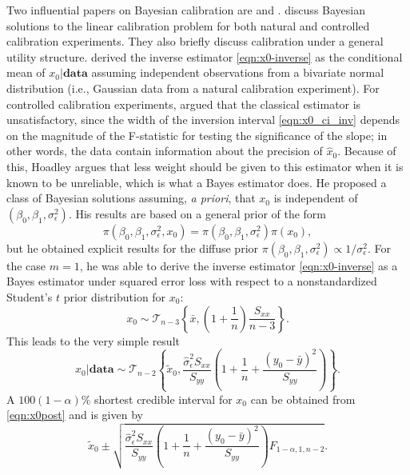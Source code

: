 \documentclass[cmfont,usenames,dvipsnames,leqno]{afit-etd}\usepackage[]{graphicx}\usepackage[]{color}
\newcommand{\wh}[1]{\ensuremath{\widehat{#1}}}
\newcommand{\wt}[1]{\ensuremath{\widetilde{#1}}}
\begin{document}
Two influential papers on Bayesian calibration are \citet{hoadley_bayesian_1970} and \citet{hunter_bayesian_1981}. \citet[chap. 10]{aitchison_statistical_1980} discuss Bayesian solutions to the linear calibration problem for both natural and controlled calibration experiments. They also briefly discuss calibration under a general utility structure. \citet{dunsmore_bayesian_1967} derived the inverse estimator \eqref{eqn:x0-inverse} as the conditional mean of $x_0|\mathbf{data}$ assuming independent observations from a bivariate normal distribution (i.e., Gaussian data from a natural calibration experiment). For controlled calibration experiments, \citet{hoadley_bayesian_1970} argued that the classical estimator is unsatisfactory, since the width of the inversion interval \eqref{eqn:x0_ci_inv} depends on the magnitude of the F-statistic for testing the significance of the slope; in other words, the data contain information about the precision of $\wh{x}_0$. Because of this, Hoadley argues that less weight should be given to this estimator when it is known to be unreliable, which is what a Bayes estimator does. He proposed a class of Bayesian solutions assuming, \textit{a priori}, that $x_0$ is independent of $(\beta_0, \beta_1, \sigma_\epsilon^2)$. His results are based on a general prior of the form 
\begin{equation*}
  \pi\left(\beta_0, \beta_1, \sigma_\epsilon^2, x_0\right) = \pi\left(\beta_0, \beta_1, \sigma_\epsilon^2\right) \pi\left(x_0\right), 
\end{equation*}
but he obtained explicit results for the diffuse prior $\pi\left(\beta_0, \beta_1, \sigma_\epsilon^2\right) \propto 1/\sigma_\epsilon^2$. For the case $m=1$, he was able to derive the inverse estimator \eqref{eqn:x0-inverse} as a Bayes estimator under squared error loss with respect to a nonstandardized Student's $t$ prior distribution for $x_0$:
\begin{equation}
\label{eqn:x0prior}
  x_0 \sim \mathcal{T}_{n-3}\left\{\bar{x}, \left(1+\frac{1}{n}\right)\frac{S_{xx}}{n-3}\right\}. 
\end{equation}
This leads to the very simple result
\begin{equation}
\label{eqn:x0post}
  x_0|\mathbf{data} \sim \mathcal{T}_{n-2}\left\{\wt{x}_0, \frac{\wh{\sigma}_\epsilon^2 S_{xx}}{S_{yy}}\left( 1+\frac{1}{n}+\frac{(y_0 - \bar{y})^2}{S_{yy}} \right)\right\}. 
\end{equation}
A $100(1-\alpha)\%$ shortest credible interval for $x_0$ can be obtained from \eqref{eqn:x0post} and is given by
\begin{equation}
\label{eqn:sci}
  \wt{x}_0 \pm \sqrt{\frac{\wh{\sigma}_\epsilon^2 S_{xx}}{S_{yy}}\left( 1+\frac{1}{n}+\frac{(y_0 - \bar{y})^2}{S_{yy}} \right)F_{1-\alpha, 1, n-2}}.
\end{equation}
\end{document}
